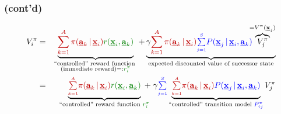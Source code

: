 \begin{frame}\frametitle{\subsecname (cont'd)}

\slidesonly{\vspace{-5mm}}



\pause

\slidesonly{\vspace{-10mm}}

	\begin{align}
		V^\pi_i 
		&=& \underbrace{
		{\color{policy} \sum_{k=1}^A \pi(\vec a_k \,|\, \vec x_i)}
			 {\color{reward} r(\vec x_i, \vec a_k)}
			 }_{\substack{\text{``controlled'' reward function }\\
			 \text{(immediate reward)} =: {\color{reward} r_i^\pi}}
			 }
			+ \underbrace{
			\gamma {\color{policy} \sum_{k=1}^A \pi(\vec a_k \,|\, \vec x_i)} {\color{trans}\smallsum{j=1}{S} 
				P(\vec x_j \,|\, \vec x_i, \vec a_k)} \kern-1.2ex
				\overbrace{V^\pi_j}^{=V^\pi(\vec x_j)}
				}_{\text{expected discounted value of successor state}} \\
		&=& 
			\underbrace{{\color{policy} \smallsum{k=1}A 
				\pi(\vec a_k \,|\, \vec x_i)} 
				{\color{reward} r(\vec x_i, \vec a_k)}
			}_{\kern-4ex\text{``controlled'' reward function }
					{\color{reward} r_i^\pi}\kern-4ex}
			\;+\; \gamma {\color{trans} \smallsum{j=1}{S}}
			\underbrace{
				{\color{policy} \smallsum{k=1}A 
				\pi(\vec a_k \,|\, \vec x_i)} 
				{\color{trans} P(\vec x_j \,|\, \vec x_i, \vec a_k)}
			}_{\text{``controlled'' transition model }
					{\color{trans} P^\pi_{ij}}}  V^\pi_j
	\end{align}
	
	
	
\end{frame}

